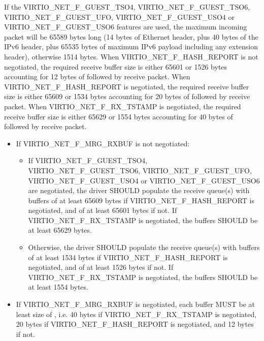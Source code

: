 If the VIRTIO_NET_F_GUEST_TSO4, VIRTIO_NET_F_GUEST_TSO6,
VIRTIO_NET_F_GUEST_UFO, VIRTIO_NET_F_GUEST_USO4 or VIRTIO_NET_F_GUEST_USO6
features are used, the maximum incoming packet
will be 65589 bytes long (14 bytes of Ethernet header, plus 40 bytes of
the IPv6 header, plus 65535 bytes of maximum IPv6 payload including any
extension header), otherwise 1514 bytes.
When VIRTIO_NET_F_HASH_REPORT is not negotiated, the required receive buffer
size is either 65601 or 1526 bytes accounting for 12 bytes of
 followed by receive packet.
When VIRTIO_NET_F_HASH_REPORT is negotiated, the required receive buffer
size is either 65609 or 1534 bytes accounting for 20 bytes of
 followed by receive packet.
When VIRTIO_NET_F_RX_TSTAMP is negotiated, the required receive buffer
size is either 65629 or 1554 bytes accounting for 40 bytes of
 followed by receive packet.


\begin{itemize}
\item If VIRTIO_NET_F_MRG_RXBUF is not negotiated:
  \begin{itemize}
    \item If VIRTIO_NET_F_GUEST_TSO4, VIRTIO_NET_F_GUEST_TSO6, VIRTIO_NET_F_GUEST_UFO,
	VIRTIO_NET_F_GUEST_USO4 or VIRTIO_NET_F_GUEST_USO6 are negotiated, the driver SHOULD populate
      the receive queue(s) with buffers of at least 65609 bytes if
      VIRTIO_NET_F_HASH_REPORT is negotiated, and of at least 65601 bytes if not.
      If VIRTIO_NET_F_RX_TSTAMP is negotiated, the buffers SHOULD be at least 65629 bytes.
    \item Otherwise, the driver SHOULD populate the receive queue(s)
      with buffers of at least 1534 bytes if VIRTIO_NET_F_HASH_REPORT
      is negotiated, and of at least 1526 bytes if not.
      If VIRTIO_NET_F_RX_TSTAMP is negotiated, the buffers SHOULD be at least 1554 bytes.
  \end{itemize}
\item If VIRTIO_NET_F_MRG_RXBUF is negotiated, each buffer MUST be at
least size of ,
i.e. 40 bytes if VIRTIO_NET_F_RX_TSTAMP is negotiated, 20 bytes if VIRTIO_NET_F_HASH_REPORT is negotiated, and 12 bytes if not.
\end{itemize}

